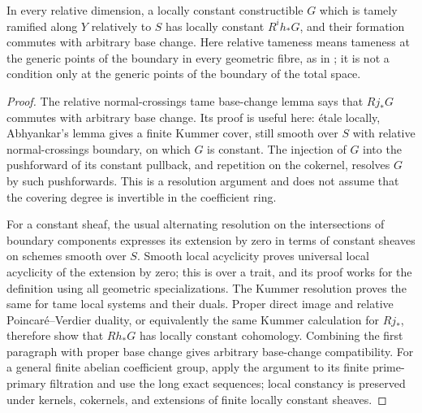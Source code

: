 \begin{proposition}
\label{D:tame-sufficient}
In every relative dimension, a locally constant constructible $G$
which is tamely ramified along $Y$ relatively to $S$ has locally
constant $R^i h_*G$, and their formation commutes with arbitrary base
change. Here relative tameness means tameness at the generic points
of the boundary in every geometric fibre, as in
\cite[XIII, Definition 2.1.1]{SGA1}; it is not a condition only at
the generic points of the boundary of the total space.
\end{proposition}
\begin{proof}
The relative normal-crossings tame base-change lemma
\cite[XIII, Lemma 2.1.10, p. 105]{SGA7II} says that $Rj_*G$ commutes with
arbitrary base change. Its proof is useful here: \'etale locally,
Abhyankar's lemma gives a finite Kummer cover, still smooth over $S$
with relative normal-crossings boundary, on which $G$ is constant.
The injection of $G$ into the pushforward of its constant pullback,
and repetition on the cokernel, resolves $G$ by such pushforwards.
This is a resolution argument and does not assume that the covering
degree is invertible in the coefficient ring.

For a constant sheaf, the usual alternating resolution on the
intersections of boundary components expresses its extension by zero
in terms of constant sheaves on schemes smooth over $S$. Smooth
local acyclicity proves universal local acyclicity of the extension
by zero; this is \cite[XIII, Lemma 2.1.11, p. 105]{SGA7II} over a trait,
and its proof works for the definition using all geometric
specializations. The Kummer resolution proves the same for tame
local systems and their duals. Proper direct image and relative
Poincar\'e--Verdier duality, or equivalently the same Kummer
calculation for $Rj_*$, therefore show that $Rh_*G$ has locally
constant cohomology. Combining the first paragraph with proper base
change gives arbitrary base-change compatibility.
For a general finite abelian coefficient group, apply the argument
to its finite prime-primary filtration and use the long exact
sequences; local constancy is preserved under kernels, cokernels,
and extensions of finite locally constant sheaves.
\end{proof}

